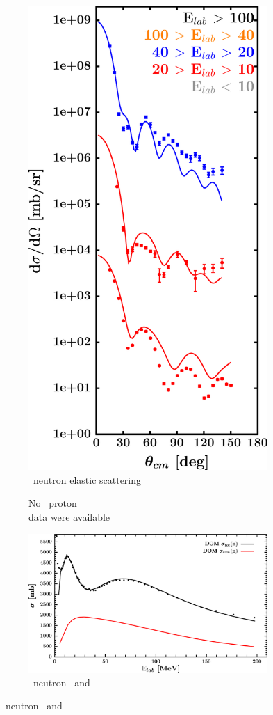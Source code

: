 \begin{figure}[hbtp]
\begin{subfigure}[c]{0.39\textheight}
        \includegraphics[width=0.52\linewidth]{figures/sn124_neutronElastic.png}
        \caption{\snFour\ neutron elastic scattering}
        \label{DOMFitData_sn124_neutron_elastic}
    \end{subfigure}\vspace{0.70in}
    \begin{subfigure}[c]{0.45\textwidth}
        \centering
        \caption{No \snFour\ proton \rxn\\ data were available}
        \label{DOMFitData_sn124_proton_inelastic}
    \end{subfigure}\hspace{6pt}
    \begin{subfigure}[c]{0.45\textwidth}
        \centering
        \includegraphics[width=\linewidth]{figures/sn124_neutronInelastic.png}
        \caption{\snFour\ neutron \rxn\ and \tot}
        \label{DOMFitData_sn124_neutron_inelastic}
    \end{subfigure}
\end{figure}
